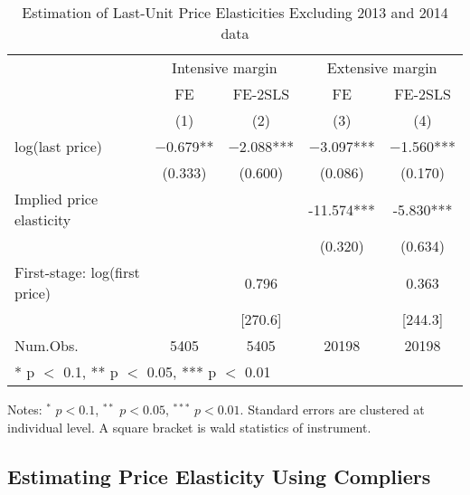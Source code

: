 \documentclass[
  11pt,
  a4paper,
]{article}
\begin{document}
\begin{table}

\caption{\label{tab:WoAnnoucementElasticity}Estimation of Last-Unit Price Elasticities Excluding 2013 and 2014 data}
\centering
\fontsize{7}{9}\selectfont
\begin{threeparttable}
\begin{tabular}[t]{lcccc}
\toprule
\multicolumn{1}{c}{ } & \multicolumn{2}{c}{Intensive margin} & \multicolumn{2}{c}{Extensive margin} \\
\cmidrule(l{3pt}r{3pt}){2-3} \cmidrule(l{3pt}r{3pt}){4-5}
\multicolumn{1}{c}{ } & \multicolumn{1}{c}{FE} & \multicolumn{1}{c}{FE-2SLS} & \multicolumn{1}{c}{FE} & \multicolumn{1}{c}{FE-2SLS} \\
\cmidrule(l{3pt}r{3pt}){2-2} \cmidrule(l{3pt}r{3pt}){3-3} \cmidrule(l{3pt}r{3pt}){4-4} \cmidrule(l{3pt}r{3pt}){5-5}
  & (1) & (2) & (3) & (4)\\
\midrule
log(last price) & \num{-0.679}** & \num{-2.088}*** & \num{-3.097}*** & \num{-1.560}***\\
 & (\num{0.333}) & (\num{0.600}) & (\num{0.086}) & (\num{0.170})\\
\midrule
Implied price elasticity &  &  & -11.574*** & -5.830***\\
 &  &  & (0.320) & (0.634)\\
First-stage: log(first price) &  & 0.796 &  & 0.363\\
 &  & {}[270.6] &  & {}[244.3]\\
Num.Obs. & \num{5405} & \num{5405} & \num{20198} & \num{20198}\\
\bottomrule
\multicolumn{5}{l}{\rule{0pt}{1em}* p $<$ 0.1, ** p $<$ 0.05, *** p $<$ 0.01}\\
\end{tabular}
\begin{tablenotes}
\item Notes: $^{*}$ $p < 0.1$, $^{**}$ $p < 0.05$, $^{***}$ $p < 0.01$. Standard errors are clustered at individual level. A square bracket is wald statistics of instrument.
\end{tablenotes}
\end{threeparttable}
\end{table}

\hypertarget{estimating-price-elasticity-using-compliers}{%
\subsection{Estimating Price Elasticity Using Compliers}\label{estimating-price-elasticity-using-compliers}}
\end{document}
